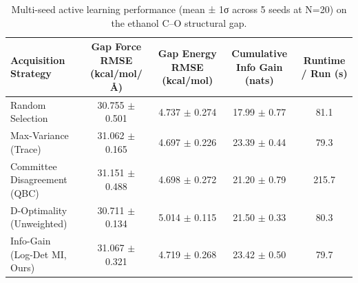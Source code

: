 \begin{table}[htbp]
\centering
\caption{Multi-seed active learning performance (mean ± 1σ across 5 seeds at N=20) on the ethanol C–O structural gap.}
\label{tab:acquisition_comparison}
\begin{tabular}{lcccc}
\toprule
Acquisition Strategy & Gap Force RMSE (kcal/mol/Å) & Gap Energy RMSE (kcal/mol) & Cumulative Info Gain (nats) & Runtime / Run (s) \\
\midrule
Random Selection & 30.755 $\pm$ 0.501 & 4.737 $\pm$ 0.274 & 17.99 $\pm$ 0.77 & 81.1 \\
Max-Variance (Trace) & 31.062 $\pm$ 0.165 & 4.697 $\pm$ 0.226 & 23.39 $\pm$ 0.44 & 79.3 \\
Committee Disagreement (QBC) & 31.151 $\pm$ 0.488 & 4.698 $\pm$ 0.272 & 21.20 $\pm$ 0.79 & 215.7 \\
D-Optimality (Unweighted) & 30.711 $\pm$ 0.134 & 5.014 $\pm$ 0.115 & 21.50 $\pm$ 0.33 & 80.3 \\
Info-Gain (Log-Det MI, Ours) & 31.067 $\pm$ 0.321 & 4.719 $\pm$ 0.268 & 23.42 $\pm$ 0.50 & 79.7 \\
\bottomrule
\end{tabular}
\end{table}
